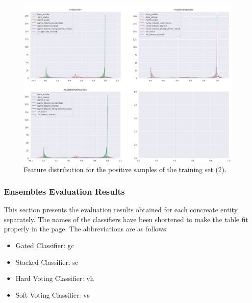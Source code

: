 \documentclass[epsfig,a4paper,11pt,titlepage,twoside,openany]{book}
\begin{document}
\begin{figure}[H]
      \centering
      \includegraphics[width=\linewidth]{features_distribution_positive_samples_2}
      \caption{Feature distribution for the positive samples of the training set (2).}
      \label{fig:distribution-of-training-positive-features-2}
\end{figure}



\subsubsection{Ensembles Evaluation Results}
\label{sec:apx-ensemble-eval-results}

This section presents the evaluation results obtained for each concreate entity separately. The names of the classifiers have been shortened to make the table fit properly in the page. The abbreviations are as follows:

\begin{itemize}
    \item Gated Classifier: gc
    \item Stacked Classifier: sc
    \item Hard Voting Classifier: vh
    \item Soft Voting Classifier: vs
\end{itemize}
\end{document}
